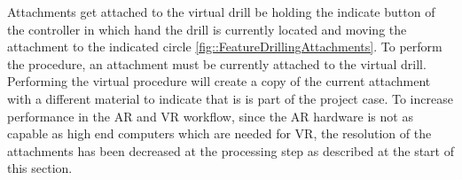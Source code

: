 Attachments get attached to the virtual drill be holding the indicate button of the controller in which hand the drill is currently located and moving the attachment to the indicated circle \ref{fig::FeatureDrillingAttachments}.
To perform the procedure, an attachment must be currently attached to the virtual drill.
Performing the virtual procedure will create a copy of the current attachment with a different material to indicate that is is part of the project case.
To increase performance in the AR and VR workflow, since the AR hardware is not as capable as high end computers which are needed for VR, the resolution of the attachments has been decreased at the processing step as described at the start of this section.